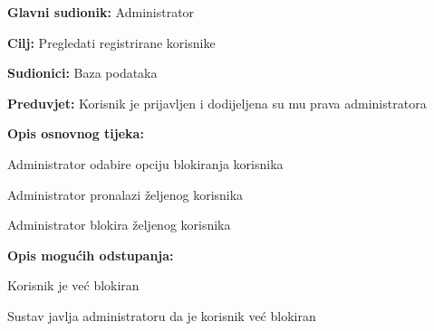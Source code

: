 				\noindent {}
					\begin{packed_item}
	
						\item \textbf{Glavni sudionik: }Administrator
						\item  \textbf{Cilj:} Pregledati registrirane korisnike
						\item  \textbf{Sudionici:} Baza podataka
						\item  \textbf{Preduvjet:} Korisnik je prijavljen i dodijeljena su mu prava administratora
						\item  \textbf{Opis osnovnog tijeka:}
						
						\item[] \begin{packed_enum}
	
							\item Administrator odabire opciju blokiranja korisnika
							\item Administrator pronalazi željenog korisnika
							\item Administrator blokira željenog korisnika

						\end{packed_enum}
						
						\item  \textbf{Opis mogućih odstupanja:}
						
						\item[] \begin{packed_item}
	
							\item[3.a] Korisnik je već blokiran
							
								\begin{packed_item}
								
									\item Sustav javlja administratoru da je korisnik već blokiran
								
								\end{packed_item}
							
						\end{packed_item}						
					\end{packed_item}
					
